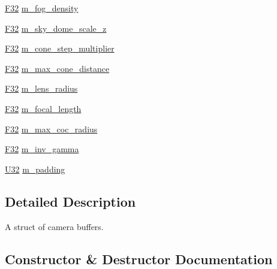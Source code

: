 \begin{DoxyCompactItemize}
\item 
\hyperlink{namespacemage_aa97e833b45f06d60a0a9c4fc22ae02c0}{F32} \hyperlink{structmage_1_1rendering_1_1_camera_buffer_aa9c3a305adfbeb717d480e822ed1c77e}{m\+\_\+fog\+\_\+density}
\item 
\hyperlink{namespacemage_aa97e833b45f06d60a0a9c4fc22ae02c0}{F32} \hyperlink{structmage_1_1rendering_1_1_camera_buffer_abfb4dbb9a228b6a7412b09b179fd157d}{m\+\_\+sky\+\_\+dome\+\_\+scale\+\_\+z}
\item 
\hyperlink{namespacemage_aa97e833b45f06d60a0a9c4fc22ae02c0}{F32} \hyperlink{structmage_1_1rendering_1_1_camera_buffer_a802e8c4ba601b91658cb30c2f1c2cfe2}{m\+\_\+cone\+\_\+step\+\_\+multiplier}
\item 
\hyperlink{namespacemage_aa97e833b45f06d60a0a9c4fc22ae02c0}{F32} \hyperlink{structmage_1_1rendering_1_1_camera_buffer_a99515c320feafb88a2d2fdf24520975d}{m\+\_\+max\+\_\+cone\+\_\+distance}
\item 
\hyperlink{namespacemage_aa97e833b45f06d60a0a9c4fc22ae02c0}{F32} \hyperlink{structmage_1_1rendering_1_1_camera_buffer_a7915bec843e03ad2248c08b10317ccc7}{m\+\_\+lens\+\_\+radius}
\item 
\hyperlink{namespacemage_aa97e833b45f06d60a0a9c4fc22ae02c0}{F32} \hyperlink{structmage_1_1rendering_1_1_camera_buffer_a7ed5079582d476597f8bc4d6a0b3f372}{m\+\_\+focal\+\_\+length}
\item 
\hyperlink{namespacemage_aa97e833b45f06d60a0a9c4fc22ae02c0}{F32} \hyperlink{structmage_1_1rendering_1_1_camera_buffer_a3273510e0a7bbdd9481fe67f9e223f59}{m\+\_\+max\+\_\+coc\+\_\+radius}
\item 
\hyperlink{namespacemage_aa97e833b45f06d60a0a9c4fc22ae02c0}{F32} \hyperlink{structmage_1_1rendering_1_1_camera_buffer_a0ff45fc9f243d43fa43952b026900ade}{m\+\_\+inv\+\_\+gamma}
\item 
\hyperlink{namespacemage_a41c104c036fba3756a74e19f793eeaa1}{U32} \hyperlink{structmage_1_1rendering_1_1_camera_buffer_a89a72a725654361121771db8668f7f58}{m\+\_\+padding}
\end{DoxyCompactItemize}


\subsection{Detailed Description}
A struct of camera buffers. 

\subsection{Constructor \& Destructor Documentation}
\hypertarget{structmage_1_1rendering_1_1_camera_buffer_a751c2923a5deb710d7c3957f04c89fcf}{}\label{structmage_1_1rendering_1_1_camera_buffer_a751c2923a5deb710d7c3957f04c89fcf} 

